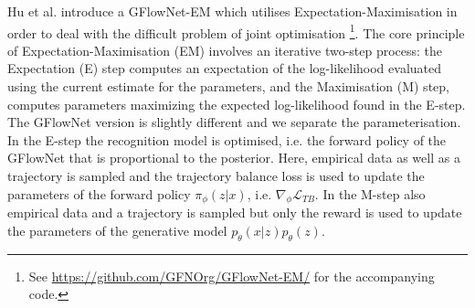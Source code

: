 \subsubsection{}
Hu et al. introduce a GFlowNet-EM which utilises Expectation-Maximisation in order to deal with the difficult problem of joint optimisation \cite{hu_gflownet-em_2023} \footnote{See \url{https://github.com/GFNOrg/GFlowNet-EM/} for the accompanying code.}.
The core principle of Expectation-Maximisation (EM) involves an iterative two-step process: the Expectation (E) step computes an expectation of the log-likelihood evaluated using the current estimate for the parameters, and the Maximisation (M) step, computes parameters maximizing the expected log-likelihood found in the E-step. The GFlowNet version is slightly different and we separate the parameterisation.
In the E-step the recognition model is optimised, i.e. the forward policy of the GFlowNet that is proportional to the posterior.
Here, empirical data as well as a trajectory is sampled and the trajectory balance loss is used to update the parameters of the forward policy $\pi_\phi(z|x)$, i.e. $\nabla_\phi \mathcal{L}_{TB}$.
In the M-step also empirical data and a trajectory is sampled but only the reward is used to update the parameters of the generative model $p_\theta(x \vert z) p_\theta(z)$.




